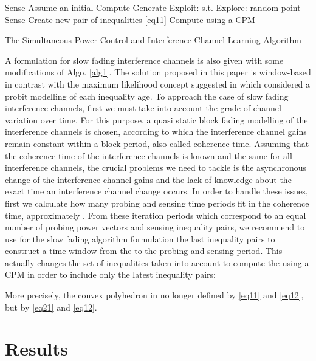 \documentclass[journal]{IEEEtran}
\begin{document}
\begin{algorithm}
\begin{algorithmic}
\STATE 
\STATE 
\STATE Sense 
\STATE Assume an initial 
\LOOP
\STATE 
\STATE Compute 
\STATE Generate  
\IF{}
\STATE Exploit:  s.t. 
\ELSE
\STATE Explore:  random point 
\ENDIF
\STATE Sense 
\STATE Create new pair of inequalities \eqref{eq11}
\STATE Compute  using a CPM
\ENDLOOP
\end{algorithmic}
\caption{The Simultaneous Power Control and Interference Channel Learning Algorithm}\label{GA}
\label{alg1}
\end{algorithm}

A formulation for slow fading interference channels is also given with some modifications of Algo. \ref{alg1}. The solution proposed in this paper is window-based in contrast with the maximum likelihood concept suggested in \cite{biban73} which considered a probit modelling of each inequality age. To approach the case of slow fading interference channels, first we must take into account the grade of channel variation over time. For this purpose, a quasi static block fading modelling of the interference channels is chosen, according to which the interference channel gains remain constant within a block period, also called coherence time. Assuming that the coherence time  of the interference channels is known and the same for all interference channels, the crucial problems we need to tackle is the asynchronous change of the interference channel gains and the lack of knowledge about the exact time an interference channel change occurs. In order to handle these issues, first we calculate how many probing and sensing time periods fit in the coherence time, approximately . From these  iteration periods which correspond to an equal number of probing power vectors and sensing inequality pairs, we recommend to use for the slow fading algorithm formulation the last  inequality pairs to construct a time window from the  to the  probing and sensing period. This actually changes the set of inequalities taken into account to compute the  using a CPM in order to include only the latest  inequality pairs:


More precisely, the convex polyhedron in no longer defined by \eqref{eq11} and \eqref{eq12}, but by \eqref{eq21} and \eqref{eq12}.


\section{Results}
\end{document}
